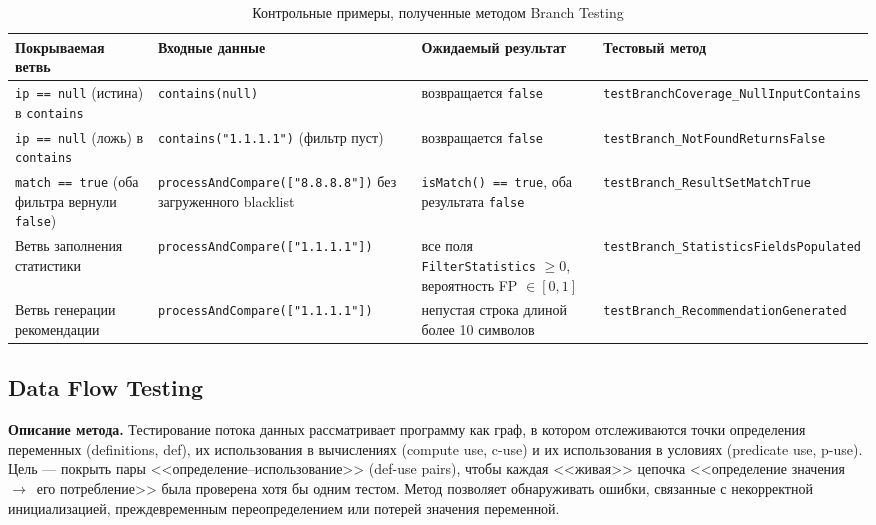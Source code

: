\begin{table}[ht]
\centering\small
\caption{Контрольные примеры, полученные методом Branch Testing}
\label{tab:branch-cases}
\begin{tabular}{|p{4.2cm}|p{4.2cm}|p{3.5cm}|p{2.6cm}|}
\hline
\textbf{Покрываемая ветвь} & \textbf{Входные данные} & \textbf{Ожидаемый результат} & \textbf{Тестовый метод} \\
\hline
\texttt{ip == null} (истина) в \texttt{contains} & \texttt{contains(null)} & возвращается \texttt{false} & \texttt{testBranch\-Coverage\_Null\-Input\-Contains} \\
\hline
\texttt{ip == null} (ложь) в \texttt{contains} & \texttt{contains("1.1.1.1")} (фильтр пуст) & возвращается \texttt{false} & \texttt{testBranch\_Not\-Found\-Returns\-False} \\
\hline
\texttt{match == true} (оба фильтра вернули \texttt{false}) & \texttt{processAndCompare(["8.8.8.8"])} без загруженного blacklist & \texttt{isMatch() == true}, оба результата \texttt{false} & \texttt{testBranch\_Result\-Set\-Match\-True} \\
\hline
Ветвь заполнения статистики & \texttt{processAndCompare(["1.1.1.1"])} & все поля \texttt{FilterStatistics} $\geq 0$, вероятность FP $\in [0, 1]$ & \texttt{testBranch\_Statistics\-Fields\-Populated} \\
\hline
Ветвь генерации рекомендации & \texttt{processAndCompare(["1.1.1.1"])} & непустая строка длиной более 10 символов & \texttt{testBranch\_Recom\-mendation\-Generated} \\
\hline
\end{tabular}
\end{table}

\subsection{Data Flow Testing} \label{ch3:sec2:dataflow}

\textbf{Описание метода.} Тестирование потока данных рассматривает программу как граф, в котором отслеживаются точки определения переменных (definitions, def), их использования в вычислениях (compute use, c-use) и их использования в условиях (predicate use, p-use). Цель --- покрыть пары <<определение--использование>> (def-use pairs), чтобы каждая <<живая>> цепочка <<определение значения~$\rightarrow$~его потребление>> была проверена хотя бы одним тестом. Метод позволяет обнаруживать ошибки, связанные с некорректной инициализацией, преждевременным переопределением или потерей значения переменной.

